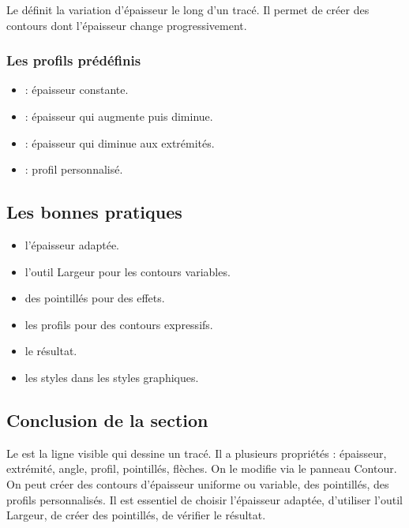 Le  définit la variation d'épaisseur le long d'un tracé. Il permet de créer des contours dont l'épaisseur change progressivement.

\subsubsection{Les profils prédéfinis}

\begin{itemize}
    \item {} : épaisseur constante.
    \item {} : épaisseur qui augmente puis diminue.
    \item {} : épaisseur qui diminue aux extrémités.
    \item {} : profil personnalisé.
\end{itemize}

\subsection{Les bonnes pratiques}

\begin{itemize}
    \item {} l'épaisseur adaptée.
    \item {} l'outil Largeur pour les contours variables.
    \item {} des pointillés pour des effets.
    \item {} les profils pour des contours expressifs.
    \item {} le résultat.
    \item {} les styles dans les styles graphiques.
\end{itemize}

\subsection*{Conclusion de la section}

Le  est la ligne visible qui dessine un tracé. Il a plusieurs propriétés : épaisseur, extrémité, angle, profil, pointillés, flèches. On le modifie via le panneau Contour. On peut créer des contours d'épaisseur uniforme ou variable, des pointillés, des profils personnalisés. Il est essentiel de choisir l'épaisseur adaptée, d'utiliser l'outil Largeur, de créer des pointillés, de vérifier le résultat.

